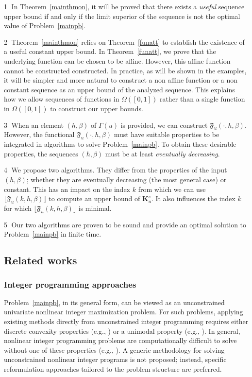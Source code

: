 \documentclass{article}
\def\funset{\Gamma}
\def\fset{\Omega([0,1])}
\def\Fu{\mathfrak{F}_u}
\def\bigks{\mathbf{K}^s}
\def\blue#1{#1}
\begin{document}
\blue{
\noindent \textcircled{\small 1} In Theorem~\ref{mainthmon}, it will be proved that there exists a {\it useful} sequence upper bound if and only if the limit superior of the sequence is not the optimal value of Problem~\ref{mainpb}.
}

\blue{
\noindent \textcircled{\small 2} Theorem~\ref{mainthmon} relies on Theorem~\ref{funatt} to establish the existence of a useful constant upper bound. In Theorem~\ref{funatt}, we prove that the underlying function can be chosen to be affine. However, this affine function cannot be constructed constructed. In practice, as will be shown in the examples, it will be simpler and more natural to construct a non affine function or a non constant sequence as an upper bound of the analyzed sequence. This explains how we allow sequences of functions in $\fset$ rather than a single function in $\fset$ to construct our upper bounds.
}

\blue{
\noindent \textcircled{\small 3} When an element $(h,\beta)$ of $\funset(u)$ is provided, we can construct $\Fu(\cdot,h,\beta)$. However, the functional $\Fu(\cdot,h,\beta)$ must have suitable properties to be integrated in algorithms to solve Problem~\ref{mainpb}. To obtain these desirable properties, the sequences $(h,\beta)$ must be at least {\it eventually decreasing}.   		  
}

\blue{
\noindent \textcircled{\small 4} We propose two algorithms. They differ from the properties of the input $(h,\beta)$; whether they are eventually decreasing (the most general case) or constant. This has an impact on the index $k$ from which we can use $\lfloor\Fu(k,h,\beta)\rfloor$ to compute an upper bound of $\bigks_u$. It also influences the index $k$ for which $\lfloor\Fu(k,h,\beta)\rfloor$ is minimal.
}

\blue{
\noindent \textcircled{\small 5} Our two algorithms are proven to be sound and provide an optimal solution to Problem~\ref{mainpb} in finite time.
}	
\blue{	
	\subsection{Related works}
	\subsubsection{Integer programming approaches}
	Problem~\ref{mainpb}, in its general form, can be viewed as an unconstrained univariate nonlinear integer maximization problem. For such problems, applying existing methods directly from unconstrained integer programming requires either discrete convexity properties (e.g.,  \cite{murota2009recent}) or a unimodal property (e.g., \cite{HASSIN2018795}). In general, nonlinear integer programming problems are computationally difficult to solve without one of these properties (e.g., \cite{Hemmecke2010}). A generic methodology for solving unconstrained nonlinear integer programs is not proposed; instead, specific reformulation approaches tailored to the problem structure are preferred.  
}	
\end{document}
